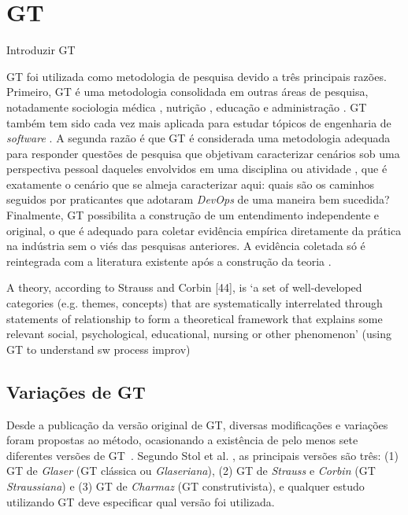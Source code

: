 \section{\acrfull{GT}}

Introduzir GT

\acrshort{GT} foi utilizada como metodologia de pesquisa devido a três principais
razões. Primeiro, \acrshort{GT} é uma metodologia consolidada em outras áreas de
pesquisa, notadamente sociologia médica \cite{gt_medical_sociology}, nutrição
\cite{gt_nursing}, educação \cite{gt_education} e administração
\cite{gt_management}. \acrshort{GT} também tem sido cada vez mais aplicada
para estudar tópicos de engenharia de \textit{software}
\cite{hoda2017becoming,Waterman:2015:ICSE,stol2016grounded}. A segunda
razão é que \acrshort{GT} é considerada uma metodologia adequada para responder
questões de pesquisa que objetivam caracterizar cenários sob uma perspectiva
pessoal daqueles envolvidos em uma disciplina ou atividade \cite{stol2016grounded},
que é exatamente o cenário que se almeja caracterizar aqui: quais são os caminhos
seguidos por praticantes que adotaram \textit{DevOps} de uma maneira bem
sucedida? Finalmente, \acrshort{GT} possibilita a construção de um entendimento
independente e original, o que é adequado para coletar evidência empírica
diretamente da prática na indústria sem o viés das pesquisas anteriores.
A evidência coletada só é reintegrada com a literatura existente após a construção
da teoria \cite{}.

A theory, according to Strauss and Corbin [44], is ‘a set of well-developed
categories (e.g. themes, concepts) that are systematically interrelated through statements of
relationship to form a theoretical framework that explains some relevant social, psychological,
educational, nursing or other phenomenon’ (using GT to understand sw process improv)



\subsection{Variações de \acrshort{GT}}

Desde a publicação da versão original de \acrshort{GT}, diversas modificações
e variações foram propostas ao método, ocasionando a existência de pelo menos
sete diferentes versões de \acrfull{GT}~\cite{denzin2007grounded}. Segundo
Stol et al. \cite{stol2016grounded}, as principais versões são três: (1)
\acrshort{GT} de \textit{Glaser} (GT clássica ou \textit{Glaseriana}), (2)
\acrshort{GT} de \textit{Strauss} e \textit{Corbin} (GT \textit{Straussiana}) e
(3) \acrshort{GT} de \textit{Charmaz} (GT construtivista), e qualquer
estudo utilizando \acrshort{GT} deve especificar qual versão foi utilizada.

